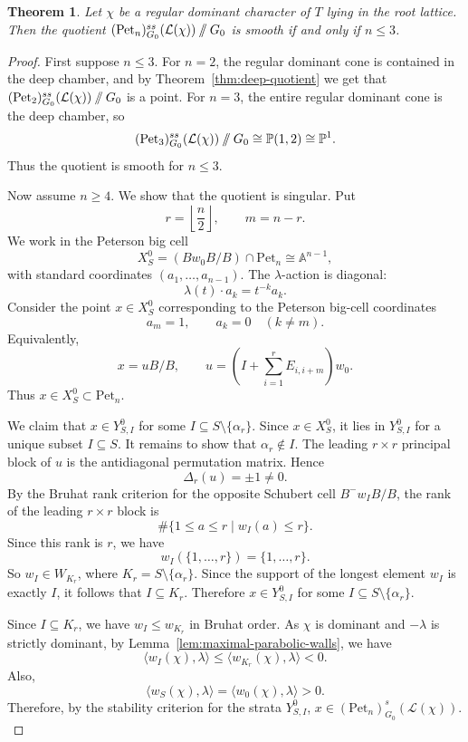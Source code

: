 \documentclass[12pt, reqno]{amsart}
\newcommand{\sslash}{\mathbin{/\mkern-6mu/}}
\theoremstyle{plain}
\numberwithin{equation}{section}
\newtheorem{theorem}{Theorem}[section]
\theoremstyle{definition}
\begin{document}
\begin{theorem}\label{thm:smoothness} Let $\chi$ be a regular dominant character of \(T\) lying in the root lattice. Then the quotient $(\mathrm{Pet}_n)^{ss}_{G_0}(\mathcal L(\chi))\sslash G_0$ is smooth if and only if \(n\le3\).
\end{theorem}

\begin{proof}
First suppose \(n\le3\). For \(n=2\), the regular dominant cone is
contained in the deep chamber, and by Theorem~\ref{thm:deep-quotient} we get that $(\mathrm{Pet}_2)^{ss}_{G_0}(\mathcal L(\chi))\sslash G_0$ is a point. For \(n=3\), the entire regular dominant cone is the
deep chamber, so
\[
(\mathrm{Pet}_3)^{ss}_{G_0}(\mathcal L(\chi))\sslash G_0
\cong
\mathbb P(1,2)\cong\mathbb P^1.
\]
Thus the quotient is smooth for \(n\le3\).

Now assume \(n\ge 4\). We show that the quotient is singular. Put
\[
r=\left\lfloor\frac n2\right\rfloor,
\qquad
m=n-r.
\]
We work in the Peterson big cell
\[
X_S^0=(Bw_0B/B)\cap \mathrm{Pet}_n\cong \mathbb A^{n-1},
\]
with standard coordinates $(a_1,\ldots,a_{n-1}).$
The \(\lambda\)-action is diagonal:
\[
\lambda(t)\cdot a_k=t^{-k}a_k.
\]
Consider the point \(x\in X_S^0\) corresponding to the
Peterson big-cell coordinates
\[
a_m=1,\qquad a_k=0\quad(k\neq m).
\]
Equivalently,
\[
x=uB/B,
\qquad
u=
\left(I+\sum_{i=1}^{r}E_{i,i+m}\right)w_0.
\]
Thus \(x\in X_S^0\subset \mathrm{Pet}_n\).

We claim that \(x\in Y^0_{S,I}\) for some $I\subseteq S\setminus\{\alpha_r\}.$ Since \(x\in X_S^0\), it lies in \(Y^0_{S,I}\) for a unique subset
\(I\subseteq S\). It remains to show that \(\alpha_r\notin I\). The leading \(r\times r\) principal block of \(u\) is the antidiagonal
permutation matrix.
Hence
\[
\Delta_r(u)=\pm 1\neq 0.
\]
By the Bruhat rank criterion for the opposite Schubert cell
\(B^-w_IB/B\), the rank of the leading \(r\times r\) block is
\[
\#\{1\leq a\leq r\mid w_I(a)\leq r\}.
\]
Since this rank is \(r\), we have
\[
w_I(\{1,\ldots,r\})=\{1,\ldots,r\}.
\]
So \(w_I\in W_{K_r}\), where $K_r=S\setminus\{\alpha_r\}.$
Since the support of the longest element \(w_I\) is exactly \(I\),
it follows that $I\subseteq K_r.$ Therefore $x\in Y^0_{S,I}$
for some \(I\subseteq S\setminus\{\alpha_r\}\).

Since \(I\subseteq K_r\), we have \(w_I\le w_{K_r}\) in Bruhat
order. As \(\chi\) is dominant and \(-\lambda\) is strictly dominant, by Lemma~\ref{lem:maximal-parabolic-walls}, we have
\[
\langle w_I(\chi),\lambda\rangle
\le
\langle w_{K_r}(\chi),\lambda\rangle
<0.
\]
Also,
\[
\bigl\langle w_S(\chi),\lambda\bigr\rangle
=
\bigl\langle w_0(\chi),\lambda\bigr\rangle>0.
\]
Therefore, by the stability criterion for the strata \(Y^0_{S,I}\), $
x\in (\mathrm{Pet}_n)^s_{G_0}(\mathcal L(\chi)).$


\end{proof}
\end{document}
